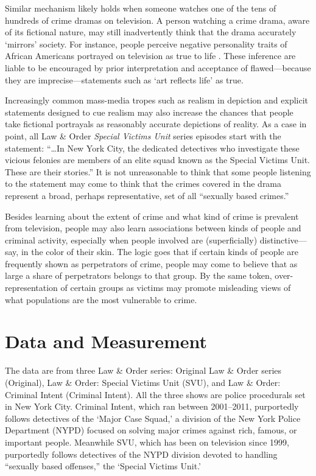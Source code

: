 \documentclass[11pt, letterpaper]{article}
\begin{document}
Similar mechanism likely holds when someone watches one of the tens of hundreds of crime dramas on television. A person watching a crime drama, aware of its fictional nature, may still inadvertently think that the drama accurately `mirrors' society. For instance, people perceive negative personality traits of African Americans portrayed on television as true to life \citep{punyanunt2008perceived}. These inference are liable to be encouraged by prior interpretation and acceptance of flawed---because they are imprecise---statements such as `art reflects life' as true.

Increasingly common mass-media tropes such as realism in depiction and explicit statements designed to cue realism may also increase the chances that people take fictional portrayals as reasonably accurate depictions of reality. As a case in point, all Law \& Order \textit{Special Victims Unit} series episodes start with the statement: ``\ldots In New York City, the dedicated detectives who investigate these vicious felonies are members of an elite squad known as the Special Victims Unit. These are their stories.'' It is not unreasonable to think that some people listening to the statement may come to think that the crimes covered in the drama represent a broad, perhaps representative, set of all ``sexually based crimes.''

Besides learning about the extent of crime and what kind of crime is prevalent from television, people may also learn associations between kinds of people and criminal activity, especially when people involved are (superficially) distinctive---say, in the color of their skin. The logic goes that if certain kinds of people are frequently shown as perpetrators of crime, people may come to believe that as large a share of perpetrators belongs to that group. By the same token, over-representation of certain groups as victims may promote misleading views of what populations are the most vulnerable to crime.

\section*{Data and Measurement}
The data are from three Law \& Order series: Original Law \& Order series (Original), Law \& Order: Special Victims Unit (SVU), and Law \& Order: Criminal Intent (Criminal Intent). All the three shows are police procedurals set in New York City. Criminal Intent, which ran between 2001--2011, purportedly follows detectives of the `Major Case Squad,' a division of the New York Police Department (NYPD) focused on solving major crimes against rich, famous, or important people. Meanwhile SVU, which has been on television since 1999, purportedly follows detectives of the NYPD division devoted to handling ``sexually based offenses,'' the `Special Victims Unit.'
\end{document}
